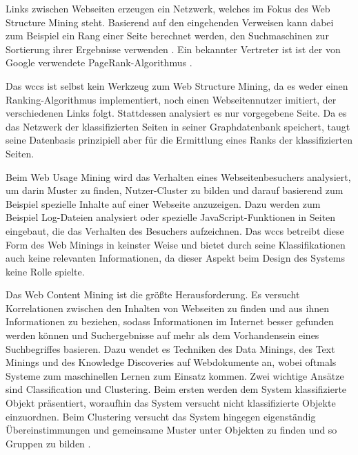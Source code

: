         Links zwischen Webseiten erzeugen ein Netzwerk,
        welches im Fokus des Web Structure Mining steht.
        Basierend auf den eingehenden Verweisen kann dabei zum Beispiel
        ein Rang einer Seite berechnet werden,
        den Suchmaschinen zur Sortierung ihrer Ergebnisse verwenden
        \cite[Part I]{markov:webMining}.
        Ein bekannter Vertreter ist ist der von Google verwendete PageRank-Algorithmus
        \cite{page:pageRank}.

        Das \gls{wccs} ist selbst kein Werkzeug zum Web Structure Mining,
        da es weder einen Ranking-Algorithmus implementiert,
        noch einen Webseitennutzer imitiert, der verschiedenen Links folgt.
        Stattdessen analysiert es nur vorgegebene Seite.
        Da es das Netzwerk der klassifizierten Seiten in seiner Graphdatenbank speichert,
        taugt seine Datenbasis prinzipiell aber für die Ermittlung eines Ranks
        der klassifizierten Seiten.

        Beim Web Usage Mining wird das Verhalten eines Webseitenbesuchers analysiert,
        um darin Muster zu finden, Nutzer-Cluster zu bilden und darauf basierend
        zum Beispiel spezielle Inhalte auf einer Webseite anzuzeigen.
        Dazu werden zum Beispiel Log-Dateien analysiert oder spezielle JavaScript-Funktionen
        in Seiten eingebaut, die das Verhalten des Besuchers aufzeichnen.
        \cite[Part III]{markov:webMining}
        Das \gls{wccs} betreibt diese Form des Web Minings in keinster Weise
        und bietet durch seine Klassifikationen auch keine relevanten Informationen,
        da dieser Aspekt beim Design des Systems keine Rolle spielte.

        Das Web Content Mining ist die größte Herausforderung.
        Es versucht Korrelationen zwischen den Inhalten von Webseiten zu finden
        und aus ihnen Informationen zu beziehen,
        sodass Informationen im Internet besser gefunden werden können
        und Suchergebnisse auf mehr als dem Vorhandensein eines Suchbegriffes basieren.
        Dazu wendet es Techniken des Data Minings,
        des Text Minings und des Knowledge Discoveries auf Webdokumente an,
        wobei oftmals Systeme zum maschinellen Lernen zum Einsatz kommen.
        Zwei wichtige Ansätze sind Classification und Clustering.
        Beim ersten werden dem System klassifizierte Objekt präsentiert,
        woraufhin das System versucht nicht klassifizierte Objekte einzuordnen.
        Beim Clustering versucht das System hingegen eigenständig
        Übereinstimmungen und gemeinsame Muster unter Objekten zu finden
        und so Gruppen zu bilden
        \cite[Part II]{markov:webMining}.
        
